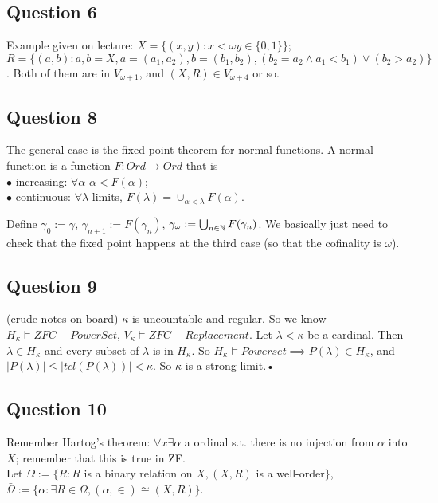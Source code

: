 \documentclass[a4paper]{article}
\begin{document}
\subsection{Question 6}
Example given on lecture: $X=\{(x,y): x< \omega y \in \{0,1\}\}$;\\
$R=\{(a,b) : a,b = X, a=(a_1,a_2), b=(b_1,b_2), (b_2=a_2 \wedge a_1<b_1) \vee (b_2 > a_2)\}$. Both of them are in $V_{\omega +1}$, and $(X,R) \in V_{\omega+4}$ or so.

\subsection{Question 8}
The general case is the fixed point theorem for normal functions. A normal function is a function $F:Ord \to Ord$ that is\\
$\bullet$ increasing: $\forall \alpha$ $\alpha < F(\alpha)$;\\
$\bullet$ continuous: $\forall \lambda$ limits, $F(\lambda) = \cup_{\alpha < \lambda} F(\alpha)$.

Define $\gamma_0 := \gamma$, $\gamma_{n+1} := F(\gamma_n)$, $\gamma_\omega := \bigcup_{n \in \mathbb{N}} F(\gamma_n)$. We basically just need to check that the fixed point happens at the third case (so that the cofinality is $\omega$).

\subsection{Question 9}
(crude notes on board) $\kappa$ is uncountable and regular. So we know $H_\kappa \vDash ZFC-PowerSet$, $V_\kappa \vDash ZFC-Replacement$. Let $\lambda < \kappa$ be a cardinal. Then $\lambda \in H_\kappa$ and every subset of $\lambda$ is in $H_\kappa$. So $H_\kappa \vDash Powerset \implies P(\lambda) \in H_\kappa$, and $|P(\lambda)| \leq |tcl(P(\lambda))| < \kappa$. So $\kappa$ is a strong limit.•

\subsection{Question 10}

Remember Hartog's theorem: $\forall x \exists \alpha$ a ordinal s.t. there is no injection from $\alpha$ into $X$; remember that this is true in ZF.\\
Let $\Omega := \{R: R$ is a binary relation on $X, (X,R)$ is a well-order$\}$,\\
$\bar{\Omega} := \{\alpha: \exists R \in \Omega, (\alpha,\in)\cong (X,R)\}$.
\end{document}
